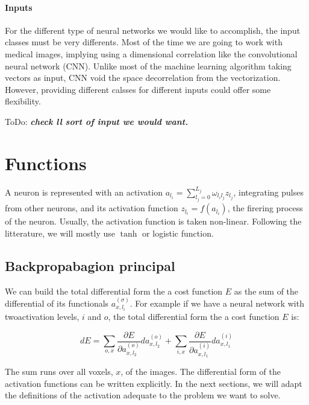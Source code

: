 \documentclass[final, paper=letter,5p,times,twocolumn]{elsarticle}
\newcommand{\ToDo}[1]{ToDo: \textbf{\textit{#1}}}
\begin{document}
\paragraph{Inputs}{For the different type of neural networks we would like to accomplish, the input classes must be very differents. Most of the time we are going to work with medical images, implying using a dimensional correlation like the convolutional neural network (CNN). Unlike most of the machine learning algorithm taking vectors as input, CNN void the space decorrelation from the vectorization. However, providing different calsses for different inputs could offer some flexibility.}

\ToDo{check ll sort of input we would want.} \\

\section{Functions}

A neuron is represented with an activation $a_{l_{i}} = \sum_{l_{j} = 0}^{L_{j}} \omega_{l_{i}l_{j}} z_{l_{j}}$, integrating pulses from other neurons, and its activation function $z_{l_{i}} = f(a_{l_{i}})$, the firering process of the neuron. Usually, the activation function is taken non-linear. Following the litterature, we will mostly use $\tanh$ or logistic function.

\subsection{Backpropabagion principal}

We can build the total differential form the a cost function $E$ as the sum of the differential of its functionals $a_{x,l_{i}}^{(\sigma)}$. For example if we have a neural network with twoactivation levels, $i$ and $o$, the total differential form the a cost function $E$ is:

\begin{equation}
  dE = \sum_{o,x} \frac{\partial E}{\partial a_{x,l_{2}}^{(o)}} da_{x,l_{2}}^{(o)} + \sum_{i,x} \frac{\partial E}{\partial a_{x,l_{1}}^{(i)}} da_{x,l_{1}}^{(i)}
  \label{eq:total_diff}
\end{equation}

The sum runs over all voxels, $x$, of the images. The differential form of the activation functions can be written explicitly. In the next sections, we will adapt the definitions of the activation adequate to the problem we want to solve.
\end{document}
